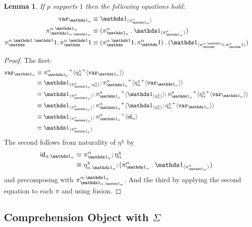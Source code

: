 \documentclass[10pt]{article}
\newtheorem{lemma}{Lemma}
\theoremstyle{definition}
\newcommand{\id}{\mathsf{id}}
\newcommand\bdot[0]{\mathbin{.}}
\newcommand\ApPlus[2]{\ensuremath{{#1}^+ \langle #2 \rangle }}
\begin{document}
\begin{lemma}
If $p$ supports $1$ then the following equations hold:
\begin{align}
\var{\One_\alpha} &\equiv \ApOne{\pi^\alpha_{\One_\alpha}} \\
\pi^{\alpha.\One_\alpha}_{\One_{\alpha.\One_\alpha}} &\equiv (\pi^\alpha_{\One_\alpha} \bdot \ApOne{\pi^\alpha_{\One_\alpha}}) \\
\pi^{\alpha.\One.\One}_\One;\pi^{\alpha.\One}_\One &\equiv (\pi^{\alpha.\One}_\One;\pi^{\alpha}_\One) \bdot (\ApOne{\pi^{\alpha.\One}_\One;\pi^{\alpha}_\One})
\end{align}
\end{lemma}
\begin{proof}
The first:
\begin{align*}
\var{\One_\alpha} 
&\equiv \ApPlus{\pi^\alpha_{\One_\alpha}}{\ApPlus{\eta^\chi_\alpha}{\var{\One_\alpha}}} \\
&\equiv \ApOne{\pi^\alpha_{\One_\alpha} ; \eta^\chi_\alpha};\ApPlus{\pi^\alpha_{\One_\alpha}}{\ApPlus{\eta^\chi_\alpha}{\var{\One_\alpha}}} \\
&\equiv \ApOne{\pi^\alpha_{\One_\alpha}};\ApPlus{\pi^\alpha_{\One_\alpha}}{\ApOne{\eta^\chi_\alpha}};\ApPlus{\pi^\alpha_{\One_\alpha}}{\ApPlus{\eta^\chi_\alpha}{\var{\One_\alpha}}} \\
&\equiv \ApOne{\pi^\alpha_{\One_\alpha}};\ApPlus{\pi^\alpha_{\One_\alpha}}{\ApOne{\eta^\chi_\alpha};\ApPlus{\eta^\chi_\alpha}{\var{\One_\alpha}}} \\
&\equiv \ApOne{\pi^\alpha_{\One_\alpha}};\ApPlus{\pi^\alpha_{\One_\alpha}}{\id_{\alpha}} \\
&\equiv \ApOne{\pi^\alpha_{\One_\alpha}}
\end{align*}
The second follows from naturality of $\eta^\chi$ by
\begin{align*}
\id_{\alpha.\One_\alpha} 
&\equiv \pi^\alpha_{\One_\alpha} ; \eta^\chi_\alpha \\
&\equiv \eta^\chi_{\alpha.\One_\alpha} ; (\pi^\alpha_{\One_\alpha} \bdot \ApOne{\pi^\alpha_{\One_\alpha}})
\end{align*}
and precomposing with $\pi^{\alpha.\One_\alpha}_{\One_{\alpha.\One_\alpha}}$.
And the third by applying the second equation to each $\pi$ and using fusion.
\end{proof}

\subsection{Comprehension Object with $\Sigma$}
\newcommand\mtt[1]{\mathtt{#1}}
\newcommand\contract[1]{\ensuremath{\mathtt{contract}_{#1}}}
\newcommand\fibpair[1]{\ensuremath{\mathtt{fibpair}_{#1}}}
\newcommand\pair[1]{\ensuremath{\mathtt{pair}_{#1}}}
\newcommand\tsplit[1]{\ensuremath{\mathtt{split}_{#1}}}
\end{document}
